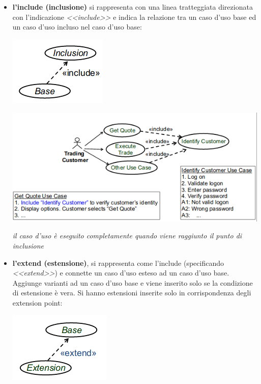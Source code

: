 \documentclass[a4paper,12pt, oneside]{book}
\begin{document}
\begin{itemize}
\begin{center}
	\end{center}
	\item \textbf{l'include (inclusione)} si rappresenta con una linea tratteggiata direzionata con l'indicazione \textit{<<include>>} e indica la relazione tra un caso d'uso base ed un caso d'uso incluso nel caso d'uso base:
	\begin{center}
		\includegraphics[scale=0.7]{img/incd.png}
	\end{center}
	\begin{center}
		\includegraphics[scale=0.7]{img/incd2.png}
	\end{center}
	\textit{il caso d'uso è eseguito completamente quando viene raggiunto il punto di inclusione}
	\item \textbf{l'extend (estensione)}, si rappresenta come l'include (specificando \textit{<<extend>>}) e connette un caso d'uso esteso ad un caso d'uso base. Aggiunge varianti ad un caso d’uso base e viene inserito solo se la condizione di estensione è vera. Si hanno estensioni inserite solo in corrispondenza degli extension point:
	\begin{center}
		\includegraphics[scale=0.7]{img/extd.png}
	\end{center}
	\begin{center}

\end{center}
\end{itemize}
\end{document}
